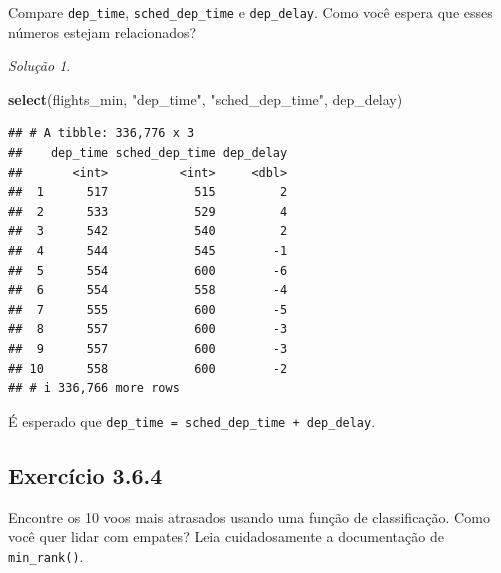 \documentclass[
]{latex/krantz}
\newenvironment{Shaded}{\begin{snugshade}}{\end{snugshade}}
\newcommand{\FunctionTok}[1]{\textcolor[rgb]{0.13,0.29,0.53}{\textbf{#1}}}
\newcommand{\NormalTok}[1]{#1}
\newcommand{\StringTok}[1]{\textcolor[rgb]{0.31,0.60,0.02}{#1}}
\theoremstyle{definition}
\theoremstyle{definition}
\theoremstyle{definition}
\theoremstyle{definition}
\theoremstyle{remark}
\newtheorem*{solution}{Solução}
\begin{document}
Compare \texttt{dep\_time}, \texttt{sched\_dep\_time} e \texttt{dep\_delay}. Como você espera que esses números estejam relacionados?

\begin{solution}
\leavevmode

\begin{Shaded}
\begin{Highlighting}[]
\FunctionTok{select}\NormalTok{(flights\_min, }\StringTok{"dep\_time"}\NormalTok{, }\StringTok{"sched\_dep\_time"}\NormalTok{, dep\_delay)}
\end{Highlighting}
\end{Shaded}

\begin{verbatim}
## # A tibble: 336,776 x 3
##    dep_time sched_dep_time dep_delay
##       <int>          <int>     <dbl>
##  1      517            515         2
##  2      533            529         4
##  3      542            540         2
##  4      544            545        -1
##  5      554            600        -6
##  6      554            558        -4
##  7      555            600        -5
##  8      557            600        -3
##  9      557            600        -3
## 10      558            600        -2
## # i 336,766 more rows
\end{verbatim}

É esperado que \texttt{dep\_time\ =\ sched\_dep\_time\ +\ dep\_delay}.

\end{solution}

\hypertarget{exr3-6-4}{%
\subsection*{Exercício 3.6.4}\label{exr3-6-4}}

Encontre os 10 voos mais atrasados usando uma função de classificação. Como você quer lidar com empates? Leia cuidadosamente a documentação de \texttt{min\_rank()}.
\end{document}
